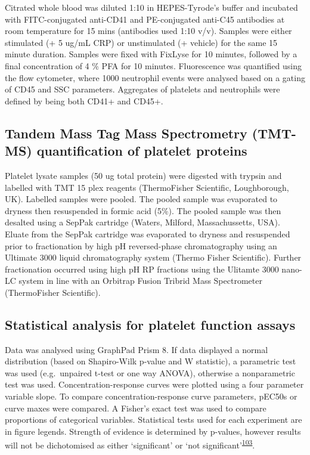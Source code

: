 \documentclass[11pt,twoside]{bristolthesis}
\begin{document}
Citrated whole blood was diluted 1:10 in HEPES-Tyrode's buffer and incubated with FITC-conjugated anti-CD41 and PE-conjugated anti-C45 antibodies at room temperature for 15 mins (antibodies used 1:10 v/v). Samples were either stimulated (+ 5 ug/mL CRP) or unstimulated (+ vehicle) for the same 15 minute duration. Samples were fixed with FixLyse for 10 minutes, followed by a final concentration of 4 \% PFA for 10 minutes. Fluorescence was quantified using the flow cytometer, where 1000 neutrophil events were analysed based on a gating of CD45 and SSC parameters. Aggregates of platelets and neutrophils were defined by being both CD41+ and CD45+.

\hypertarget{tandem-mass-tag-mass-spectrometry-tmt-ms-quantification-of-platelet-proteins}{%
\subsection{Tandem Mass Tag Mass Spectrometry (TMT-MS) quantification of platelet proteins}\label{tandem-mass-tag-mass-spectrometry-tmt-ms-quantification-of-platelet-proteins}}

Platelet lysate samples (50 ug total protein) were digested with trypsin and labelled with TMT 15 plex reagents (ThermoFisher Scientific, Loughborough, UK). Labelled samples were pooled. The pooled sample was evaporated to dryness then resuspended in formic acid (5\%). The pooled sample was then desalted using a SepPak cartridge (Waters, Milford, Massachussetts, USA). Eluate from the SepPak cartridge was evaporated to dryness and resuspended prior to fractionation by high pH reversed-phase chromatography using an Ultimate 3000 liquid chromatography system (Thermo Fisher Scientific). Further fractionation occurred using high pH RP fractions using the Ulitamte 3000 nano-LC system in line with an Orbitrap Fusion Tribrid Mass Spectrometer (ThermoFisher Scientific).

\hypertarget{statistical-analysis-for-platelet-function-assays}{%
\subsection{Statistical analysis for platelet function assays}\label{statistical-analysis-for-platelet-function-assays}}

Data was analysed using GraphPad Prism 8. If data displayed a normal distribution (based on Shapiro-Wilk p-value and W statistic), a parametric test was used (e.g.~unpaired t-test or one way ANOVA), otherwise a nonparametric test was used. Concentration-response curves were plotted using a four parameter variable slope. To compare concentration-response curve parameters, pEC50s or curve maxes were compared. A Fisher's exact test was used to compare proportions of categorical variables. Statistical tests used for each experiment are in figure legends. Strength of evidence is determined by p-values, however results will not be dichotomised as either `significant' or `not significant'\textsuperscript{\protect\hyperlink{ref-Sterne2001}{103}}.
\end{document}
